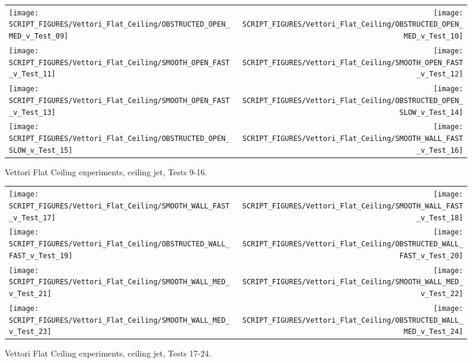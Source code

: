 \begin{figure}[p]
\begin{tabular*}{\textwidth}{l@{\extracolsep{\fill}}r}
\texttt{[image: SCRIPT\_FIGURES/Vettori\_Flat\_Ceiling/OBSTRUCTED\_OPEN\_MED\_v\_Test\_09]} &
\texttt{[image: SCRIPT\_FIGURES/Vettori\_Flat\_Ceiling/OBSTRUCTED\_OPEN\_MED\_v\_Test\_10]} \\
\texttt{[image: SCRIPT\_FIGURES/Vettori\_Flat\_Ceiling/SMOOTH\_OPEN\_FAST\_v\_Test\_11]} &
\texttt{[image: SCRIPT\_FIGURES/Vettori\_Flat\_Ceiling/SMOOTH\_OPEN\_FAST\_v\_Test\_12]} \\
\texttt{[image: SCRIPT\_FIGURES/Vettori\_Flat\_Ceiling/SMOOTH\_OPEN\_FAST\_v\_Test\_13]} &
\texttt{[image: SCRIPT\_FIGURES/Vettori\_Flat\_Ceiling/OBSTRUCTED\_OPEN\_SLOW\_v\_Test\_14]} \\
\texttt{[image: SCRIPT\_FIGURES/Vettori\_Flat\_Ceiling/OBSTRUCTED\_OPEN\_SLOW\_v\_Test\_15]} &
\texttt{[image: SCRIPT\_FIGURES/Vettori\_Flat\_Ceiling/SMOOTH\_WALL\_FAST\_v\_Test\_16]} \\
\end{tabular*}
\caption[Vettori Flat Ceiling experiments, ceiling jet, Tests 9-16]{Vettori Flat Ceiling experiments, ceiling jet, Tests 9-16.}
\label{Vettori_2}
\end{figure}

\begin{figure}[p]
\begin{tabular*}{\textwidth}{l@{\extracolsep{\fill}}r}
\texttt{[image: SCRIPT\_FIGURES/Vettori\_Flat\_Ceiling/SMOOTH\_WALL\_FAST\_v\_Test\_17]} &
\texttt{[image: SCRIPT\_FIGURES/Vettori\_Flat\_Ceiling/SMOOTH\_WALL\_FAST\_v\_Test\_18]} \\
\texttt{[image: SCRIPT\_FIGURES/Vettori\_Flat\_Ceiling/OBSTRUCTED\_WALL\_FAST\_v\_Test\_19]} &
\texttt{[image: SCRIPT\_FIGURES/Vettori\_Flat\_Ceiling/OBSTRUCTED\_WALL\_FAST\_v\_Test\_20]} \\
\texttt{[image: SCRIPT\_FIGURES/Vettori\_Flat\_Ceiling/SMOOTH\_WALL\_MED\_v\_Test\_21]} &
\texttt{[image: SCRIPT\_FIGURES/Vettori\_Flat\_Ceiling/SMOOTH\_WALL\_MED\_v\_Test\_22]} \\
\texttt{[image: SCRIPT\_FIGURES/Vettori\_Flat\_Ceiling/SMOOTH\_WALL\_MED\_v\_Test\_23]} &
\texttt{[image: SCRIPT\_FIGURES/Vettori\_Flat\_Ceiling/OBSTRUCTED\_WALL\_MED\_v\_Test\_24]} \\
\end{tabular*}
\caption[Vettori Flat Ceiling experiments, ceiling jet, Tests 17-24]{Vettori Flat Ceiling experiments, ceiling jet, Tests 17-24.}
\label{Vettori_3}
\end{figure}

